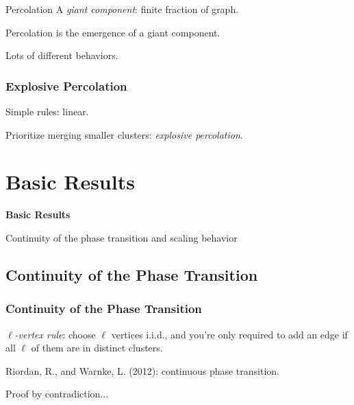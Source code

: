 \documentclass{beamer}
\begin{document}
\begin{frame}{Percolation}
	A \textit{giant component}: finite fraction of graph.
	\vspace{5mm}

	Percolation is the emergence of a giant component.
	\vspace{5mm}

	Lots of different behaviors.
\end{frame}

\begin{frame}
	\frametitle{Explosive Percolation}

	Simple rules: linear.
	\vspace{5mm}

	Prioritize merging smaller clusters: \textit{explosive percolation}.
\end{frame}

\section{Basic Results}

{
\begin{frame}
        \bfseries
        {\color{white}
                \huge Basic Results
        }
        \vspace{5mm}

        {\color{myblue}
                Continuity of the phase transition and scaling behavior
        }
\end{frame}
}

\subsection{Continuity of the Phase Transition}

\begin{frame}
	\frametitle{Continuity of the Phase Transition}

	\textit{$\ell$-vertex rule}: choose $\ell$ vertices i.i.d., and you're only required to add an edge if all $\ell$ of them are in distinct clusters.
	\vspace{5mm}

	Riordan, R., and Warnke, L. (2012): continuous phase transition.
	\vspace{5mm}

	\pause
	Proof by contradiction...
\end{frame}
\end{document}
